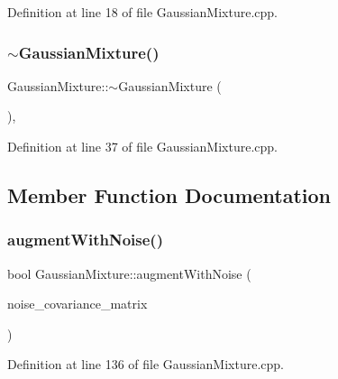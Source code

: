 Definition at line 18 of file Gaussian\+Mixture.\+cpp.

\mbox{\label{classbfl_1_1GaussianMixture_aec7b09d8d2da90388879500466d4d349}} 
\subsubsection{\texorpdfstring{$\sim$\+Gaussian\+Mixture()}{~GaussianMixture()}}
{\footnotesize\ttfamily Gaussian\+Mixture\+::$\sim$\+Gaussian\+Mixture (\begin{DoxyParamCaption}{ }\end{DoxyParamCaption})\hspace{0.3cm}{\ttfamily [virtual]}, {\ttfamily [noexcept]}}



Definition at line 37 of file Gaussian\+Mixture.\+cpp.



\subsection{Member Function Documentation}
\mbox{\label{classbfl_1_1GaussianMixture_aec4e807341e18c18faed041c41121cb7}} 
\subsubsection{\texorpdfstring{augment\+With\+Noise()}{augmentWithNoise()}}
{\footnotesize\ttfamily bool Gaussian\+Mixture\+::augment\+With\+Noise (\begin{DoxyParamCaption}\item[{const Eigen\+::\+Ref$<$ const Eigen\+::\+Matrix\+Xd $>$ \&}]{noise\+\_\+covariance\+\_\+matrix }\end{DoxyParamCaption})}



Definition at line 136 of file Gaussian\+Mixture.\+cpp.



